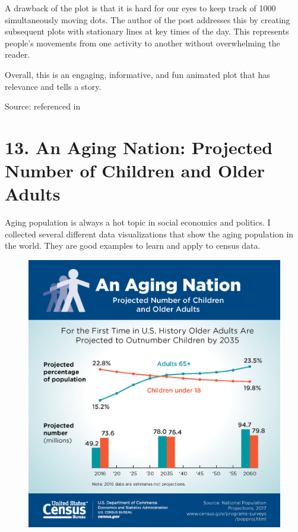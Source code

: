 \documentclass[]{book}
\theoremstyle{definition}
\theoremstyle{definition}
\theoremstyle{definition}
\theoremstyle{remark}
\begin{document}
A drawback of the plot is that it is hard for our eyes to keep track of
1000 simultaneously moving dots. The author of the post addresses this
by creating subsequent plots with stationary lines at key times of the
day. This represents people's movements from one activity to another
without overwhelming the reader.

Overall, this is an engaging, informative, and fun animated plot that
has relevance and tells a story.

Source: \citep{American_life} referenced in \citep{int_viz_2}

\section{13. An Aging Nation: Projected Number of Children and Older
Adults}\label{an-aging-nation-projected-number-of-children-and-older-adults}

\citep{aging_nation}

Aging population is always a hot topic in social economics and politics.
I collected several different data visualizations that show the aging
population in the world. They are good examples to learn and apply to
census data.

\begin{figure}
\centering
\includegraphics{images/aging_nation.jpg}
\caption{}
\end{figure}
\end{document}
